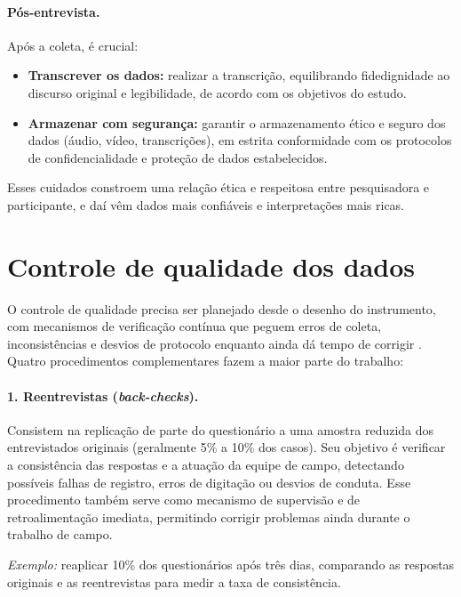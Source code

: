 \documentclass[12pt, a4paper, openany]{book}
\begin{document}
\paragraph{P\'os-entrevista.} Ap\'os a coleta, \'e crucial:

\begin{itemize}
\item \textbf{Transcrever os dados:} realizar a transcri\c{c}\~ao, equilibrando fidedignidade ao discurso original e legibilidade, de acordo com os objetivos do estudo.
\item \textbf{Armazenar com seguran\c{c}a:} garantir o armazenamento \'etico e seguro dos dados (\'audio, v\'ideo, transcri\c{c}\~oes), em estrita conformidade com os protocolos de confidencialidade e prote\c{c}\~ao de dados estabelecidos.
\end{itemize}

Esses cuidados constroem uma rela\c{c}\~ao \'etica e respeitosa entre pesquisadora e participante, e da\'i v\^em dados mais confi\'aveis e interpreta\c{c}\~oes mais ricas.

\section{Controle de qualidade dos dados}

O controle de qualidade precisa ser planejado desde o desenho do instrumento, com mecanismos de verifica\c{c}\~ao cont\'inua que peguem erros de coleta, inconsist\^encias e desvios de protocolo enquanto ainda d\'a tempo de corrigir \citep{fgvclear2025mea,gertler2018impact}. Quatro procedimentos complementares fazem a maior parte do trabalho:

\paragraph{1. Reentrevistas (\textit{back-checks}).} Consistem na replica\c{c}\~ao de parte do question\'ario a uma amostra reduzida dos entrevistados originais (geralmente 5\% a 10\% dos casos). Seu objetivo \'e verificar a consist\^encia das respostas e a atua\c{c}\~ao da equipe de campo, detectando poss\'iveis falhas de registro, erros de digita\c{c}\~ao ou desvios de conduta. Esse procedimento tamb\'em serve como mecanismo de supervis\~ao e de retroalimenta\c{c}\~ao imediata, permitindo corrigir problemas ainda durante o trabalho de campo.

\textit{Exemplo:} reaplicar 10\% dos question\'arios ap\'os tr\^es dias, comparando as respostas originais e as reentrevistas para medir a taxa de consist\^encia.
\end{document}

